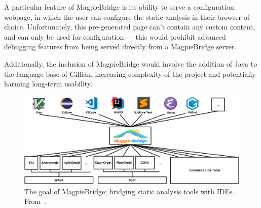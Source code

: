 A particular feature of MagpieBridge is its ability to serve a configuration
webpage, in which the user can configure the static analysis in their browser
of choice. Unfortunately, this pre-generated page can't contain any custom
content, and can only be used for configuration --- this would prohibit advanced
debugging features from being served directly from a MagpieBridge server.

Additionally, the inclusion of MagpieBridge would involve the addition of Java
to the language base of Gillian, increasing complexity of the project and
potentially harming long-term usability.


\begin{figure}
  \centering
  \includegraphics[width=\textwidth]{img/magpiebridge-goal.png}
  \caption{
    The goal of MagpieBridge; bridging static analysis tools with IDEs.
    From~\cite{magpiebridge-repo}.
  }\label{fig:magpiebridge-goal}
\end{figure}
